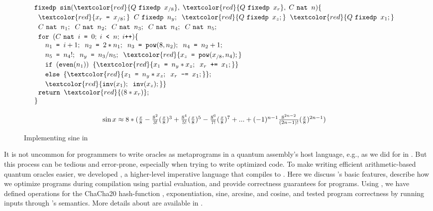 \begin{figure}[t]
{\footnotesize
\centering
\[\hspace*{-1em}
\begin{array}{c}
\begin{array}{l}
\texttt{fixedp sin}(\textcolor{red}{Q~\texttt{fixedp }x_{/8}},\;\textcolor{red}{Q~\texttt{fixedp }x_r},\;C~\texttt{nat }n)\{
\\[0.2em]
\;\;\textcolor{red}{x_r\texttt{ = }x_{/8};} \;\;C~\texttt{fixedp }n_y;\;\;\textcolor{red}{Q~\texttt{fixedp }x_z;}\;\;
\textcolor{red}{Q~\texttt{fixedp }x_1;}
\\[0.2em]
\;\;
C~\texttt{nat }n_1;\;\;
C~\texttt{nat }n_2;\;\;
C~\texttt{nat }n_3;\;\;
C~\texttt{nat }n_4;\;\;
C~\texttt{nat }n_5;
\\[0.2em]
\;\;\texttt{for }(C~\texttt{nat }i\texttt{ = }0;\; i\texttt{ < }n;\;i\texttt{++})\{\\
\;\;\quad n_1\texttt{ = }i+1;\;\;n_2\texttt{ = }2*n_1;\;\;n_3\texttt{ = }\texttt{pow}(8,n_2);\;\;
          n_4\texttt{ = }n_2+1;
\\[0.2em]
\;\;\quad n_5\texttt{ = }n_4!;\;\;n_y\texttt{ = }n_3 / n_5;\;\;
\textcolor{red}{x_z\texttt{ = }\texttt{pow}(x_{/8},n_4);}\\[0.2em]
\;\;\quad \texttt{if }(\texttt{even}(n_1))\;\;{\{
\textcolor{red}{{x_1}\texttt{ = }{n_y}*{x_z};\;\;
x_r\texttt{ += }{x_1};}

\}}\\[0.2em]
\;\;\quad\texttt{else } {\{\textcolor{red}{{x_1}\texttt{ = }{n_y}*{x_z};\;\;{x_r}\texttt{ -= }{x_1};}\};}\\[0.2em]
\;\;\quad\textcolor{red}{\texttt{inv}(x_1);\;\;\texttt{inv}(x_z);}

\}\\
\;\;\texttt{return }\textcolor{red}{(8*x_r)};\\
\}
\end{array}\\[8em]
\sin{x}\approx 8*(\frac{x}{8}-\frac{8^2}{3!}(\frac{x}{8})^3+\frac{8^4}{5!}(\frac{x}{8})^5-\frac{8^6}{7!}(\frac{x}{8})^7+...+(-1)^{n-1}\frac{8^{2n-2}}{(2n-1)!}(\frac{x}{8})^{2n-1})
\end{array}
\]
}
\vspace*{-1em}
\caption{Implementing sine in \vqimp}
\label{fig:sine-impl}
\end{figure}

It is not uncommon for programmers to write oracles as metaprograms in
a quantum assembly's host language, e.g., as we did for  in
. But this process can be tedious and error-prone,
especially when trying to write optimized code.
%
To make writing efficient arithmetic-based quantum oracles easier,
we developed \vqimp, a higher-level imperative language that compiles
to \oqasm. Here we discuss \vqimp's basic features, describe how we 
optimize \vqimp programs during compilation using partial
evaluation, and provide correctness guarantees for \vqimp programs. 
Using \vqimp, we have defined operations for the ChaCha20 hash-function \cite{chacha}, exponentiation, sine, arcsine, and cosine, and tested program correctness by running inputs through \vqimp's semantics. 
%
More details about \vqimp are available in .

